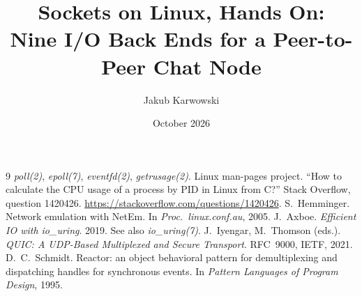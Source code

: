 \documentclass[10pt,a4paper]{article}
\title{Sockets on Linux, Hands On:\\
Nine I/O Back Ends for a Peer-to-Peer Chat Node}
\author{Jakub Karwowski}
\date{October 2026}
\begin{document}
\maketitle


\tableofcontents
\bigskip










\appendix

\begin{thebibliography}{9}
 \emph{poll(2)}, \emph{epoll(7)}, \emph{eventfd(2)}, \emph{getrusage(2)}. Linux man-pages project.
 ``How to calculate the CPU usage of a process by PID in Linux from C?''
  Stack Overflow, question 1420426.
  \url{https://stackoverflow.com/questions/1420426}.
 S.~Hemminger. Network emulation with NetEm. In \emph{Proc.\ linux.conf.au}, 2005.
 J.~Axboe. \emph{Efficient IO with io\_uring}. 2019. See also \emph{io\_uring(7)}.
 J.~Iyengar, M.~Thomson (eds.). \emph{QUIC: A UDP-Based Multiplexed and Secure Transport}. RFC~9000, IETF, 2021.
 D.~C.~Schmidt. Reactor: an object behavioral pattern for demultiplexing and dispatching handles for synchronous events. In \emph{Pattern Languages of Program Design}, 1995.
\end{thebibliography}
\end{document}
